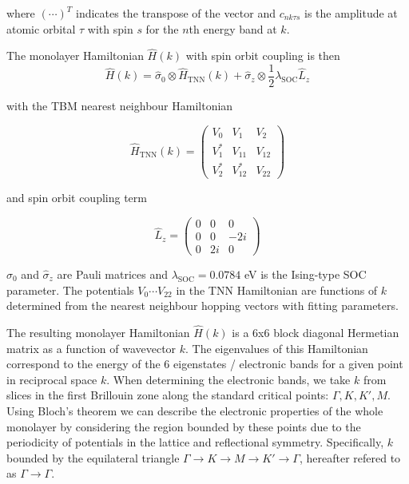\documentclass[12pt]{report} %
\begin{document}
  where $(\cdots)^T$ indicates the transpose of the vector and $c_{nk\tau s}$ is the amplitude at atomic orbital $\tau$ with spin $s$ for the $n$th energy band at $k$.

  The monolayer Hamiltonian $\hat{H}(k)$ with spin orbit coupling is then 
      \begin{equation}
        \hat{H}(k)=\hat{\sigma}_{0} \otimes \hat{H}_{\mathrm{TNN}}(k)+\hat{\sigma}_{z} \otimes \frac{1}{2} \lambda_{\mathrm{SOC}} \hat{L}_{z}
        \label{monolayer_hamitonian}
      \end{equation}

  with the TBM nearest neighbour Hamiltonian

      \begin{equation}
        \hat{H}_{\mathrm{TNN}}(k)=\left(\begin{array}{ccc}
        V_{0} & V_{1} & V_{2} \\
        V_{1}^{*} & V_{11} & V_{12} \\
        V_{2}^{*} & V_{12}^{*} & V_{22}
        \end{array}\right)
      \end{equation}

  and spin orbit coupling term

      \begin{equation}
        \hat{L}_{z}=\left(\begin{array}{ccc}
        0 & 0 & 0 \\
        0 & 0 & -2 i \\
        0 & 2 i & 0
        \end{array}\right)
      \end{equation}

  $\hat{\sigma}_0$ and $\hat{\sigma}_z$ are Pauli matrices and $\lambda_{\text{SOC}}=0.0784$ eV is the Ising-type SOC parameter. The potentials $V_0 \cdots V_{22}$ in the TNN Hamiltonian are functions of $k$ determined from the nearest neighbour hopping vectors with fitting parameters.

  The resulting monolayer Hamiltonian $\hat{H}(k)$ is a 6x6 block diagonal Hermetian matrix as a function of wavevector $k$. The eigenvalues of this Hamiltonian correspond to the energy of the 6 eigenstates / electronic bands for a given point in reciprocal space $k$. When determining the electronic bands, we take $k$ from slices in the first Brillouin zone along the standard critical points: $\Gamma, K, K', M$. Using Bloch's theorem we can describe the electronic properties of the whole monolayer by considering the region bounded by these points due to the periodicity of potentials in the lattice and reflectional symmetry. Specifically, $k$ bounded by the equilateral triangle $\Gamma \rightarrow K \rightarrow M \rightarrow K' \rightarrow \Gamma$, hereafter refered to as $\Gamma \rightarrow \Gamma$.
\end{document}
